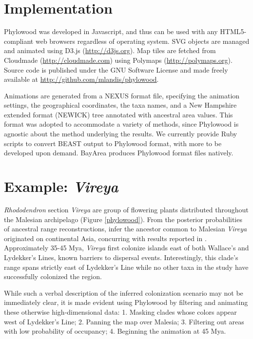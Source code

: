 \documentclass[11pt]{article}
\begin{document}
\section{Implementation}

Phylowood was developed in Javascript, and thus can be used with any HTML5-compliant web browsers regardless of operating system. SVG objects are managed and animated using D3.js (\url{http://d3js.org}). Map tiles are fetched from Cloudmade (\url{http://cloudmade.com}) using Polymaps (\url{http://polymaps.org}). Source code is published under the GNU Software License and made freely available at \url{http://github.com/mlandis/phylowood}.

Animations are generated from a NEXUS format file, specifying the animation settings, the geographical coordinates, the taxa names, and a New Hampshire extended format (NEWICK) tree annotated with ancestral area values. This format was adopted to accommodate a variety of methods, since Phylowood is agnostic about the method underlying the results. We currently provide Ruby scripts to convert BEAST output to Phylowood format, with more to be developed upon demand. BayArea produces Phylowood format files natively.

\section{Example: {\it Vireya}}

{\it Rhododendron} section {\it Vireya} are group of flowering plants distributed throughout the Malesian archipelago (Figure \ref{phylowood}). From the posterior probabilities of ancestral range reconstructions, \cite{landis12} infer the ancestor common to Malesian {\it Vireya} originated on continental Asia, concurring with results reported in \cite{webb12}. Approximately 35-45 Mya, {\it Vireya} first colonize islands east of both Wallace's and Lydekker's Lines, known barriers to dispersal events. Interestingly, this clade's range spans strictly east of Lydekker's Line while no other taxa in the study have successfully colonized the region.

While such a verbal description of the inferred colonization scenario may not be immediately clear, it is made evident using Phylowood by filtering and animating these otherwise high-dimensional data: 1. Masking clades whose colors appear west of Lydekker's Line; 2. Panning the map over Malesia; 3. Filtering out areas with low probability of occupancy; 4. Beginning the animation at 45 Mya.
\end{document}
